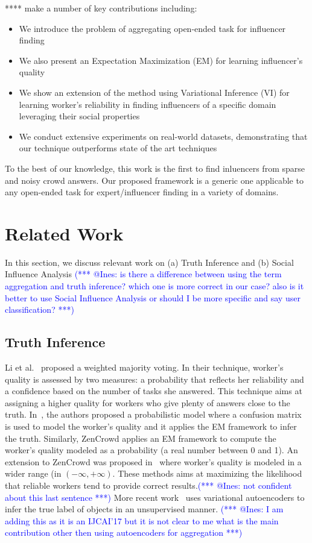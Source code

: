 \documentclass{article}
\makeatletter
\newcommand{\sys}{****\xspace}
\newcommand{\iar}[1]{\textcolor{blue}{(*** @Ines: #1 ***)}}
\makeatother
\begin{document}
 \sys make a number of key contributions including:
\begin{itemize}
\item  We introduce the problem of aggregating open-ended task for influencer finding
\item We also present an Expectation Maximization (EM)  for learning influencer's quality 
\item We show an extension of the method using Variational Inference (VI)
for learning worker's reliability in finding influencers of a specific domain leveraging their
social properties 
\item We conduct extensive experiments on real-world datasets, demonstrating that
our technique outperforms state of the art techniques
\end{itemize}
To the best of our knowledge, this work is the first to find inluencers from sparse and noisy 
crowd answers. Our proposed framework is a generic one applicable to any open-ended task
for expert/influencer finding in a variety of domains.

\section{Related Work}
In this section, we discuss relevant work on (a) Truth Inference and (b) Social Influence Analysis
\iar{is there a difference between using the term aggregation and truth inference?
which one is more correct in our case? also is  it better to use Social Influence Analysis
or should I be more specific and say user classification?}
\subsection{Truth Inference}
Li et al.~\cite{catd} proposed a weighted majority voting. In their technique, 
worker's quality is assessed by two measures: 
a probability that reflects her reliability and a confidence based on the number of tasks she
answered. This technique aims at assigning a higher quality for workers who give 
plenty of answers close to the truth.
In~\cite{dawid1979maximum}, the authors proposed a probabilistic model 
where a confusion matrix is used to model the worker's quality and it 
applies the EM framework to infer the truth. Similarly, ZenCrowd 
\cite{demartini2012zencrowd} applies an EM framework to compute the 
worker's quality modeled as a probability (a real number between 0 and 1).
An extension to ZenCrowd was proposed in~\cite{li2014resolving} where
worker's quality is modeled in a wider range (in $(-\infty,+\infty)$.
These methods aims at maximizing the likelihood that reliable workers tend to 
provide correct results.\iar{not confident about this last sentence}
More recent work~\cite{yin2017aggregating} uses variational autoencoders
to infer the true label  of objects in an unsupervised manner.
\iar{I am adding this as it is an IJCAI'17 but it is not clear to me what is the main 
contribution other then using autoencoders for aggregation}
\end{document}
